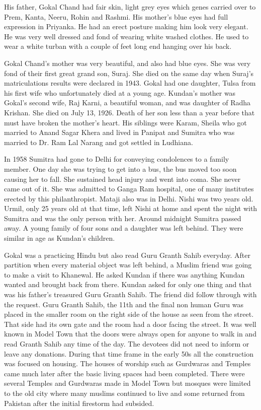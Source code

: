 His father, Gokal Chand had  fair skin, light grey eyes which genes carried over to Prem, Kanta, Neeru, Rohin and Rashmi. His mother’s blue eyes had full expression in Priyanka. He had an erect posture making him look very elegant. He was very well dressed and fond of wearing white washed clothes. He used to wear a white turban with a couple of feet long end hanging over his back. 
 
Gokal Chand's mother was very beautiful, and also had blue eyes. She was very fond of their first great grand son, Suraj. She died on the same day when Suraj's matriculations results were declared in 1943. Gokal had one daughter, Tulsa from his first wife who unfortunately died at a young age. Kundan's mother was Gokal's  second wife, Raj Karni, a beautiful woman, and was daughter of Radha Krishan. She died on July 13, 1926. Death of her son less than a year before that must have broken the mother's heart. His siblings were Karam, Sheila who got married to Anand Sagar Khera and lived in Panipat and Sumitra who was married to Dr. Ram Lal Narang and got settled in Ludhiana. 

In 1958 Sumitra had gone to Delhi for conveying condolences to a family member. One day she was trying to get into a bus, the bus moved too soon causing her to fall. She sustained head injury and went into coma. She never came out of it. She was admitted to Ganga Ram hospital, one of many institutes erected by this philanthropist. Mataji also was in Delhi. Nishi was two years old. Urmil, only 25 years old at that time, left Nishi at home and spent the night with Sumitra and was the only person with her. Around midnight Sumitra passed away. A young family of four sons and a daughter was left behind. They were similar in age as Kundan's children. 

Gokal was a practicing Hindu but also read Guru Granth Sahib everyday. After partition when every material object was left behind, a Muslim friend was going to make a visit to Khanewal. He asked Kundan if there was anything Kundan wanted and brought back from there. Kundan asked for only one thing and that was his father's treasured Guru Granth Sahib. The friend did follow through with the request. Guru Granth Sahib, the 11th and the final non human Guru was placed in the smaller room on the right side of the house as seen from the street. That side had its own gate and the room had a door facing the street. It was well known in Model Town that the doors were always open for anyone to walk in and read Granth Sahib any time of the day. The devotees did not need to inform or leave any donations. During that time frame in the early 50s all the construction was focused on housing. The houses of worship such as Gurdwaras and Temples came much later after the basic living spaces had been completed. There were several Temples and Gurdwaras made in Model Town but mosques were limited to the old city where many muslims continued to live and some returned from Pakistan after the initial firestorm had subsided.  

